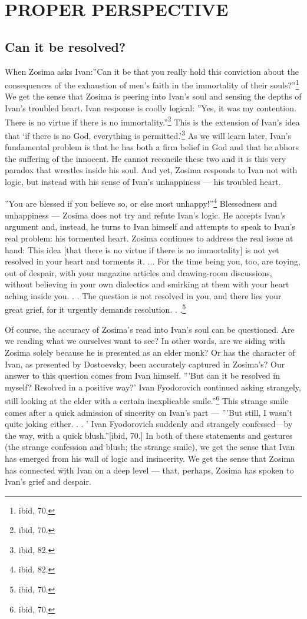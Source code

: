 \chapter{PROPER PERSPECTIVE}
	\section{Can it be resolved?}

When Zosima asks Ivan:''Can it be that you really hold this conviction about the consequences of the exhaustion of men's faith in the immortality of their souls?''\footnote{ibid, 70.} We get the sense that Zosima is peering into Ivan's soul and sensing the depths of Ivan's troubled heart. Ivan response is coolly logical: ''Yes, it was my contention. There is no virtue if there is no immortality.''\footnote{ibid, 70.} This is the extension of Ivan's idea that `if there is no God, everything is permitted.'\footnote{ibid, 82.} As we will learn later, Ivan's fundamental problem is that he has both a firm belief in God and that he abhors the suffering of the innocent. He cannot reconcile these two and it is this very paradox that wrestles inside his soul. And yet, Zosima responds to Ivan not with logic, but instead with his sense of Ivan's unhappiness --- his troubled heart.

''You are blessed if you believe so, or else most unhappy!''\footnote{ibid, 82.} Blessedness and unhappiness --- Zosima does not try and refute Ivan's logic. He accepts Ivan's argument and, instead, he turns to Ivan himself and attempts to speak to Ivan's real problem: his tormented heart. Zosima continues to address the real issue at hand: 
This idea [that there is no virtue if there is no immortality] is not yet resolved in your heart and torments it. ... For the time being you, too, are toying, out of despair, with your magazine articles and drawing-room discussions, without believing in your own dialectics and smirking at them with your heart aching inside you. . . The question is not resolved in you, and there lies your great grief, for it urgently demands resolution. . .\footnote{ibid, 70.}

Of course, the accuracy of Zosima's read into Ivan's soul can be questioned. Are we reading what we ourselves want to see? In other words, are we siding with Zosima solely because he is presented as an elder monk? Or has the character of Ivan, as presented by Dostoevsky, been accurately captured in Zosima's? Our answer to this question comes from Ivan himself. '''But can it be resolved in myself? Resolved in a positive way?' Ivan Fyodorovich continued asking strangely, still looking at the elder with a certain inexplicable smile.''\footnote{ibid, 70.} This strange smile comes after a quick admission of sincerity on Ivan's part --- '''But still, I wasn't quite joking either. . . ' Ivan Fyodorovich suddenly and strangely confessed---by the way, with a quick blush.''[ibid, 70.] In both of these statements and gestures (the strange confession and blush; the strange smile), we get the sense that Ivan has emerged from his wall of logic and insincerity. We get the sense that Zosima has connected with Ivan on a deep level --- that, perhaps, Zosima has spoken to Ivan's grief and despair.

